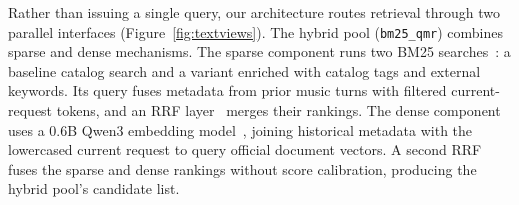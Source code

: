 \documentclass[sigconf]{acmart}
\begin{document}
Rather than issuing a single query, our architecture routes retrieval through two parallel interfaces (Figure~\ref{fig:textviews}). The hybrid pool (\texttt{bm25\_qmr}) combines sparse and dense mechanisms. The sparse component runs two BM25 searches~\cite{robertson1994okapi}: a baseline catalog search and a variant enriched with catalog tags and external keywords. Its query fuses metadata from prior music turns with filtered current-request tokens, and an RRF layer~\cite{cormack2009rrf} merges their rankings. The dense component uses a 0.6B Qwen3 embedding model~\cite{qwen3embedding2025}, joining historical metadata with the lowercased current request to query official document vectors. A second RRF fuses the sparse and dense rankings without score calibration, producing the hybrid pool's candidate list.
\end{document}
